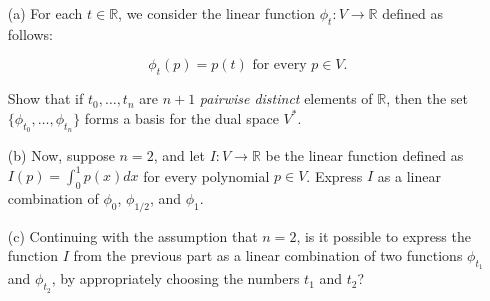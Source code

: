\documentclass[12pt]{article}
\begin{document}
		\begin{enumerate}
			\item[(a)] For each \(t \in \mathbb{R}\), we consider the linear function \(\phi_t: V \rightarrow \mathbb{R}\) defined as follows:
			
			\[\phi_t(p) = p(t) \text{ for every } p \in V.\]
			
			Show that if \(t_0, \ldots, t_n\) are \(n+1\) \textit{pairwise distinct} elements of \(\mathbb{R}\), then the set \(\{\phi_{t_0}, \ldots, \phi_{t_n}\}\) forms a basis for the dual space \(V^*\).
			
			\item[(b)] Now, suppose \(n = 2\), and let \(I: V \rightarrow \mathbb{R}\) be the linear function defined as \(I(p) = \int_{0}^{1}p(x)dx\) for every polynomial \(p \in V\). Express \(I\) as a linear combination of \(\phi_0\), \(\phi_{1/2}\), and \(\phi_1\).
			
			\item[(c)] Continuing with the assumption that \(n = 2\), is it possible to express the function \(I\) from the previous part as a linear combination of two functions \(\phi_{t_1}\) and \(\phi_{t_2}\), by appropriately choosing the numbers \(t_1\) and \(t_2\)?
		\end{enumerate}
		
\end{document}
